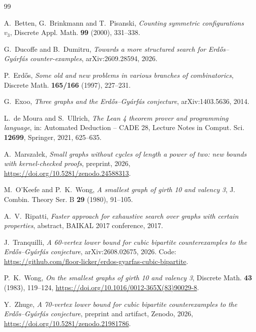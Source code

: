 \documentclass[11pt]{amsart}
\theoremstyle{definition}
\theoremstyle{remark}
\begin{document}
\begin{thebibliography}{99}

A.~Betten, G.~Brinkmann and T.~Pisanski, \emph{Counting symmetric
configurations $v_3$}, Discrete Appl. Math. \textbf{99} (2000), 331--338.

G.~Ducoffe and B.~Dumitru, \emph{Towards a more structured search for
Erdős--Gyárfás counter-examples}, arXiv:2609.28594, 2026.

P.~Erdős, \emph{Some old and new problems in various branches of combinatorics},
Discrete Math. \textbf{165/166} (1997), 227--231.

G.~Exoo, \emph{Three graphs and the Erdős--Gyárfás conjecture},
arXiv:1403.5636, 2014.

L.~de Moura and S.~Ullrich, \emph{The Lean 4 theorem prover and programming
language}, in: Automated Deduction -- CADE 28, Lecture Notes in Comput. Sci.
\textbf{12699}, Springer, 2021, 625--635.

A.~Marszałek, \emph{Small graphs without cycles of length a power of two: new
bounds with kernel-checked proofs}, preprint, 2026,
\url{https://doi.org/10.5281/zenodo.24588313}.

M.~O'Keefe and P.~K.~Wong, \emph{A smallest graph of girth 10 and valency 3},
J. Combin. Theory Ser. B \textbf{29} (1980), 91--105.

A.~V.~Ripatti, \emph{Faster approach for exhaustive search over graphs with
certain properties}, abstract, BAIKAL 2017 conference, 2017.

J.~Tranquilli, \emph{A 60-vertex lower bound for cubic bipartite
counterexamples to the Erdős--Gyárfás conjecture}, arXiv:2608.02675, 2026.
Code: \url{https://github.com/floor-licker/erdos-gyarfas-cubic-bipartite}.

P.~K.~Wong, \emph{On the smallest graphs of girth 10 and valency 3}, Discrete
Math. \textbf{43} (1983), 119--124, \url{https://doi.org/10.1016/0012-365X(83)90029-8}.

Y.~Zhuge, \emph{A 70-vertex lower bound for cubic bipartite counterexamples to
the Erdős--Gyárfás conjecture}, preprint and artifact, Zenodo, 2026,
\url{https://doi.org/10.5281/zenodo.21981786}.

\end{thebibliography}
\end{document}
